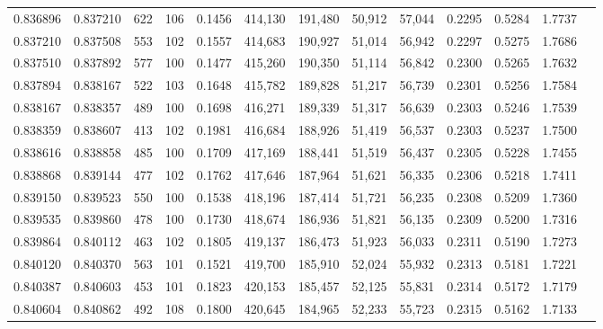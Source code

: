 \begin{tabular}{rrrrrrrrrrrrr}
0.836896 & 0.837210 &   622 & 106 &                                     0.1456 & 414,130 & 191,480 &  50,912 &  57,044 & 0.2295 & 0.5284 & 1.7737 \\
0.837210 & 0.837508 &   553 & 102 &                                     0.1557 & 414,683 & 190,927 &  51,014 &  56,942 & 0.2297 & 0.5275 & 1.7686 \\
0.837510 & 0.837892 &   577 & 100 &                                     0.1477 & 415,260 & 190,350 &  51,114 &  56,842 & 0.2300 & 0.5265 & 1.7632 \\
0.837894 & 0.838167 &   522 & 103 &                                     0.1648 & 415,782 & 189,828 &  51,217 &  56,739 & 0.2301 & 0.5256 & 1.7584 \\
0.838167 & 0.838357 &   489 & 100 &                                     0.1698 & 416,271 & 189,339 &  51,317 &  56,639 & 0.2303 & 0.5246 & 1.7539 \\
0.838359 & 0.838607 &   413 & 102 &                                     0.1981 & 416,684 & 188,926 &  51,419 &  56,537 & 0.2303 & 0.5237 & 1.7500 \\
0.838616 & 0.838858 &   485 & 100 &                                     0.1709 & 417,169 & 188,441 &  51,519 &  56,437 & 0.2305 & 0.5228 & 1.7455 \\
0.838868 & 0.839144 &   477 & 102 &                                     0.1762 & 417,646 & 187,964 &  51,621 &  56,335 & 0.2306 & 0.5218 & 1.7411 \\
0.839150 & 0.839523 &   550 & 100 &                                     0.1538 & 418,196 & 187,414 &  51,721 &  56,235 & 0.2308 & 0.5209 & 1.7360 \\
0.839535 & 0.839860 &   478 & 100 &                                     0.1730 & 418,674 & 186,936 &  51,821 &  56,135 & 0.2309 & 0.5200 & 1.7316 \\
0.839864 & 0.840112 &   463 & 102 &                                     0.1805 & 419,137 & 186,473 &  51,923 &  56,033 & 0.2311 & 0.5190 & 1.7273 \\
0.840120 & 0.840370 &   563 & 101 &                                     0.1521 & 419,700 & 185,910 &  52,024 &  55,932 & 0.2313 & 0.5181 & 1.7221 \\
0.840387 & 0.840603 &   453 & 101 &                                     0.1823 & 420,153 & 185,457 &  52,125 &  55,831 & 0.2314 & 0.5172 & 1.7179 \\
0.840604 & 0.840862 &   492 & 108 &                                     0.1800 & 420,645 & 184,965 &  52,233 &  55,723 & 0.2315 & 0.5162 & 1.7133 \\

\end{tabular}
